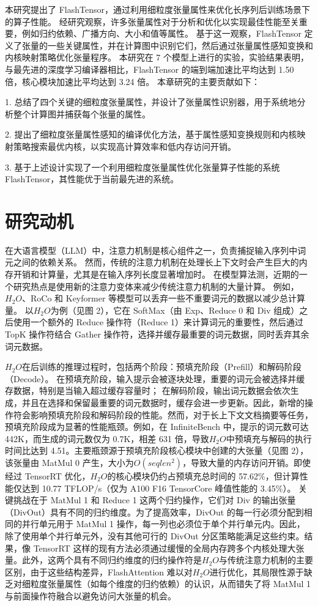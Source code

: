 本研究提出了 FlashTensor，通过利用细粒度张量属性来优化长序列后训练场景下的算子性能。
经研究观察，许多张量属性对于分析和优化以实现最佳性能至关重要，例如归约依赖、广播方向、大小和值等属性。
基于这一观察，FlashTensor 定义了张量的一些关键属性，并在计算图中识别它们，然后通过张量属性感知变换和内核映射策略优化张量程序。
本研究在 7 个模型上进行的实验，实验结果表明，与最先进的深度学习编译器相比，FlashTensor 的端到端加速比平均达到 1.50 倍，核心模块加速比平均达到 3.24 倍。
本章研究的主要贡献如下：

1. 总结了四个关键的细粒度张量属性，并设计了张量属性识别器，用于系统地分析整个计算图并捕获每个张量的属性。

2. 提出了细粒度张量属性感知的编译优化方法，基于属性感知变换规则和内核映射策略搜索最优内核，以实现高计算效率和低内存访问开销。

3. 基于上述设计实现了一个利用细粒度张量属性优化张量算子性能的系统 FlashTensor，其性能优于当前最先进的系统。

\section{研究动机}

在大语言模型（LLM）中，注意力机制是核心组件之一，负责捕捉输入序列中词元之间的依赖关系。
然而，传统的注意力机制在处理长上下文时会产生巨大的内存开销和计算量，尤其是在输入序列长度显著增加时。
在模型算法测，近期的一个研究热点是使用新的注意力变体来减少传统注意力机制的大量计算。
例如，\(H_{2}O\)、RoCo 和 Keyformer 等模型可以丢弃一些不重要词元的数据以减少总计算量。
以\(H_{2}O\)为例（见图 2），它在 SoftMax（由 Exp、Reduce 0 和 Div 组成）之后使用一个额外的 Reduce 操作符（Reduce 1）来计算词元的重要性，然后通过 TopK 操作符结合 Gather 操作符，选择并缓存最重要的词元数据，同时丢弃其余词元数据。

\(H_{2}O\)在后训练的推理过程时，包括两个阶段：预填充阶段（Prefill）和解码阶段（Decode）。
在预填充阶段，输入提示会被逐块处理，重要的词元会被选择并缓存数据，特别是当输入超过缓存容量时；
在解码阶段，输出词元数据会依次生成，并且在选择和保留最重要的词元数据时，缓存会进一步更新。因此，新增的操作符会影响预填充阶段和解码阶段的性能。然而，对于长上下文文档摘要等任务，预填充阶段成为显著的性能瓶颈。例如，在 InfiniteBench 中，提示的词元数可达 442K，而生成的词元数仅为 0.7K，相差 631 倍，导致\(H_{2}O\)中预填充与解码的执行时间比达到 4.51。主要瓶颈源于预填充阶段核心模块中创建的大张量（见图 2），该张量由 MatMul 0 产生，大小为\(O(seqlen ^{2})\)，导致大量的内存访问开销。即使经过 TensorRT 优化，\(H_{2}O\)的核心模块仍约占预填充总时间的 57.62\%，但计算性能仅达到 10.77 TFLOP/s（仅为 A100 F16 TensorCore 峰值性能的 3.45\%）。
关键挑战在于 MatMul 1 和 Reduce 1 这两个归约操作，它们对 Div 的输出张量（DivOut）具有不同的归约维度。为了提高效率，DivOut 的每一行必须分配到相同的并行单元用于 MatMul 1 操作，每一列也必须位于单个并行单元内。因此，除了使用单个并行单元外，没有其他可行的 DivOut 分区策略能满足这些约束。结果，像 TensorRT 这样的现有方法必须通过缓慢的全局内存跨多个内核处理大张量。此外，这两个具有不同归约维度的归约操作符是\(H_{2}O\)与传统注意力机制的主要区别，由于这些结构差异，FlashAttention 难以对\(H_{2}O\)进行优化，其局限性源于缺乏对细粒度张量属性（如每个维度的归约依赖）的认识，从而错失了将 MatMul 1 与前面操作符融合以避免访问大张量的机会。

